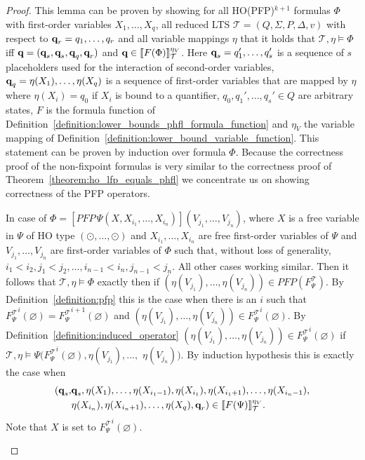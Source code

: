 \begin{proof}
    This lemma can be proven by showing for all HO(PFP)$^{k+1}$ formulas $\Phi$ with first-order variables $X_1,
    \dots, X_q$, all reduced LTS $\mathcal{T} = (Q, \Sigma, P,
    \Delta, v)$ with respect to $\emph{q}_r = q_1, \dots, q_r$ and all variable mappings $\eta$ that it holds that $\mathcal{T}, \eta \models \Phi$ iff $\emph{q} =
    (\emph{q}_s, \emph{q}_s, \emph{q}_q, \emph{q}_r)$ and $\emph{q} \in \llbracket
   F(\Phi)\rrbracket^{\eta_V}_{\mathcal{T}}$. Here $\emph{q}_s = q_1',\dots,q_s'$ is a sequence of $s$ placeholders used for the interaction of second-order variables, $\emph{q}_q = \eta(X_1), \dots, \eta(X_q)$ is a sequence of first-order variables that are mapped by $\eta$ where $\eta(X_i) = q_0$ if $X_i$ is bound to a quantifier, $q_0, q_1', \dots, q_s' \in Q$ are arbitrary states, $F$ is the formula function of
    Definition~\ref{definition:lower_bounds_phfl_formula_function} and $\eta_V$ the variable mapping of
    Definition~\ref{definition:lower_bound_variable_function}. This statement can be proven by induction over formula
    $\Phi$.
    Because the correctness proof of the non-fixpoint formulas is very similar to the correctness proof of Theorem~\ref{theorem:ho_lfp_equals_phfl} we concentrate us on showing correctness of the PFP operators.
    \begin{compactitem}
    \item In case of $\Phi = [PFP\,\Psi(X, X_{i_1}, \dots, X_{i_n})](V_{j_1}, \dots, V_{j_n})$, where $X$ is a
        free variable in $\Psi$ of HO type $(\odot, \dots, \odot)$ and $X_{i_1}, \dots, X_{i_n}$ are free first-order
        variables of $\Psi$ and $V_{j_1}, \dots, V_{j_n}$ are first-order variables of $\Phi$ such that, without loss of generality, $i_1 < i_2, j_1 < j_2, \dots, i_{n-1} < i_n, j_{n-1} < j_n$. All other cases working similar. Then it follows that
        $\mathcal{T}, \eta \models \Phi$ exactly then if $(\eta(V_{j_1}), \dots, \eta(V_{j_n})) \in PFP
        (F_\Psi^\mathcal{T})$. 
        By Definition~\ref{definition:pfp} this is the 
        case when there is an $i$ such that ${F_\Psi^\mathcal{T}}^i(\varnothing) = {F_\Psi^		
        \mathcal{T}}^{i+1}(\varnothing)$ and $(\eta(V_{j_1}), \dots, \eta(V_{j_n})) \in {F_\Psi^\mathcal{T}}^i(\varnothing)$. By Definition~\ref{definition:induced_operator} $(\eta(V_{j_1}), \dots, 		
        \eta(V_{j_n})) \in {F_\Psi^\mathcal{T}}^i(\varnothing)$ if $\mathcal{T}, \eta \models \Psi({F_\Psi^
        \mathcal{T}}^{i}(\varnothing), \eta(V_{j_1}), \dots, $ $\eta(V_{j_n}))$. By induction hypothesis 
        this is exactly the case when 
\begin{align*}
        (\emph{q}_s, &\emph{q}_s, \eta(X_1), \dots, \eta(X_{i_1-1}), \eta(X_{i_1}), \eta(X_{i_1+1}), \dots, \eta(X_{i_n-1}), \\&\eta(X_{i_n}), \eta(X_{i_n+1}), \dots, \eta
            (X_q), \emph{q}_r) \in \llbracket
        F(\Psi) \rrbracket^{\eta_V}_\mathcal{T}.
        \end{align*}       
        Note that $X$ is set to ${F_\Psi^\mathcal{T}}^{i}(\varnothing)$.
		         

\end{compactitem}
\end{proof}
